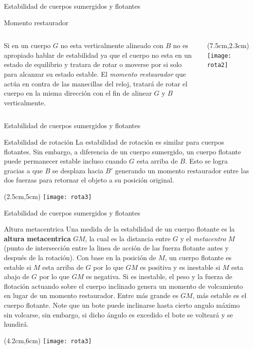 \documentclass [xcolor=svgnames, t] {beamer}
\begin{document}
\begin{frame}{Estabilidad de cuerpos sumergidos y flotantes}
\begin{block}{Momento restaurador}
\begin{columns}
Si en un cuerpo $G$ no esta verticalmente alineado con $B$ no es apropiado hablar de estabilidad ya que el cuerpo no esta en un estado de equilibrio y tratara de rotar o moverse por si solo para alcanzar su estado estable. El \emph{momento restaurador} que act\'ua en contra de las manecillas del reloj, tratar\'a de rotar el cuerpo en la misma direcci\'on con el fin de alinear $G$ y $B$ verticalmente.
\begin{textblock*}{5cm}(7.5cm,2.3cm) %
\texttt{[image: rota2]}
\end{textblock*}
\end{columns}
\end{block}
\end{frame}

\begin{frame}{Estabilidad de cuerpos sumergidos y flotantes}
\begin{block}{Estabilidad de rotaci\'on}
La estabilidad de rotaci\'on es similar para cuerpos flotantes. Sin embargo, a diferencia de un cuerpo sumergido, un cuerpo flotante puede permanecer estable incluso cuando $G$ esta arriba de $B$. Esto se logra gracias a que $B$ se desplaza hacia $B'$ generando un momento restaurador entre las dos fuerzas para retornar el objeto a su posici\'on  original. 
\begin{textblock*}{8cm}(2.5cm,5cm) %
\texttt{[image: rota3]}
\end{textblock*}
\end{block}
\end{frame}

\begin{frame}{Estabilidad de cuerpos sumergidos y flotantes}
\small
\vspace{-0.5cm}
\begin{block}{Altura metacentrica}
Una medida de la estabilidad de un cuerpo flotante es la \textbf{altura metacentrica} $GM$, la cual es la distancia entre $G$ y el \emph{metacentro} $M$ (punto de intersecci\'on entre la linea de acci\'on de las fuerza flotante antes y despu\'es de la rotaci\'on). Con base en la posici\'on de $M$, un cuerpo flotante es estable si $M$ esta arriba de $G$ por lo que $GM$ es positiva y es inestable si $M$ esta abajo de $G$ por lo que $GM$ es negativa. Si es inestable, el peso y la fuerza de flotaci\'on actuando sobre el cuerpo inclinado genera un momento de volcamiento en lugar de un momento restaurador. Entre m\'as grande es $GM$, m\'as estable es el cuerpo flotante. Note que un bote puede inclinarse hasta cierto angulo m\'aximo sin volcarse, sin embargo, si dicho \'angulo es excedido el bote se voltear\'a y se hundir\'a.  
\begin{textblock*}{5cm}(4.2cm,6cm) %
\texttt{[image: rota3]}
\end{textblock*}
\end{block}
\end{frame}
\end{document}
